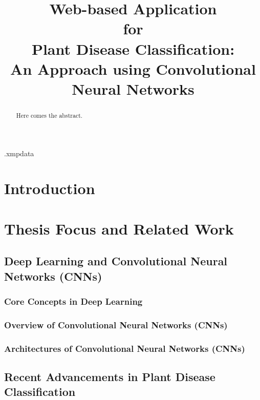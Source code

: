 \documentclass{BachelorBUI}
\title{Web-based Application\\
for\\
Plant Disease Classification:\\[0.5em]
\LARGE An Approach using Convolutional Neural Networks}
\begin{document}
\begin{filecontents}[overwrite]{\jobname.xmpdata}
\makeatletter
\Title{\@title}
\Author{\@authorname}
\Language{\@thesislanguage}
\Keywords{\@keywords}
\makeatother
\end{filecontents}
%
\maketitle
\begin{abstract}

Here comes the abstract.

\end{abstract}
\tableofcontents
\section{Introduction}
\section{Thesis Focus and Related Work}
\subsection{Deep Learning and Convolutional Neural Networks (CNNs)}
\subsubsection{Core Concepts in Deep Learning}
\subsubsection{Overview of Convolutional Neural Networks (CNNs)}
\subsubsection{Architectures of Convolutional Neural Networks (CNNs)}
\subsection{Recent Advancements in Plant Disease Classification}
\end{document}
